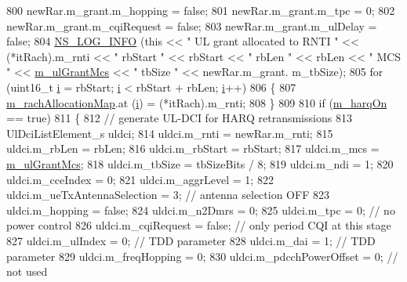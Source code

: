 \begin{DoxyCode}
800       newRar.m\_grant.m\_hopping = \textcolor{keyword}{false};
801       newRar.m\_grant.m\_tpc = 0;
802       newRar.m\_grant.m\_cqiRequest = \textcolor{keyword}{false};
803       newRar.m\_grant.m\_ulDelay = \textcolor{keyword}{false};
804       \hyperlink{group__logging_gafbd73ee2cf9f26b319f49086d8e860fb}{NS\_LOG\_INFO} (\textcolor{keyword}{this} << \textcolor{stringliteral}{" UL grant allocated to RNTI "} << (*itRach).m\_rnti << \textcolor{stringliteral}{" rbStart "} << 
      rbStart << \textcolor{stringliteral}{" rbLen "} << rbLen << \textcolor{stringliteral}{" MCS "} << \hyperlink{classns3_1_1FdTbfqFfMacScheduler_ab528c9593f9398be49667dd8f7864488}{m\_ulGrantMcs} << \textcolor{stringliteral}{" tbSize "} << newRar.m\_grant.
      m\_tbSize);
805       \textcolor{keywordflow}{for} (uint16\_t \hyperlink{bernuolliDistribution_8m_a6f6ccfcf58b31cb6412107d9d5281426}{i} = rbStart; \hyperlink{bernuolliDistribution_8m_a6f6ccfcf58b31cb6412107d9d5281426}{i} < rbStart + rbLen; \hyperlink{bernuolliDistribution_8m_a6f6ccfcf58b31cb6412107d9d5281426}{i}++)
806         \{
807           \hyperlink{classns3_1_1FdTbfqFfMacScheduler_a046aaad84777461862179b30893e38ec}{m\_rachAllocationMap}.at (\hyperlink{bernuolliDistribution_8m_a6f6ccfcf58b31cb6412107d9d5281426}{i}) = (*itRach).m\_rnti;
808         \}
809 
810       \textcolor{keywordflow}{if} (\hyperlink{classns3_1_1FdTbfqFfMacScheduler_afb4bf57d3b17b967f82a5b2134cd70e7}{m\_harqOn} == \textcolor{keyword}{true})
811         \{
812           \textcolor{comment}{// generate UL-DCI for HARQ retransmissions}
813           UlDciListElement\_s uldci;
814           uldci.m\_rnti = newRar.m\_rnti;
815           uldci.m\_rbLen = rbLen;
816           uldci.m\_rbStart = rbStart;
817           uldci.m\_mcs = \hyperlink{classns3_1_1FdTbfqFfMacScheduler_ab528c9593f9398be49667dd8f7864488}{m\_ulGrantMcs};
818           uldci.m\_tbSize = tbSizeBits / 8;
819           uldci.m\_ndi = 1;
820           uldci.m\_cceIndex = 0;
821           uldci.m\_aggrLevel = 1;
822           uldci.m\_ueTxAntennaSelection = 3; \textcolor{comment}{// antenna selection OFF}
823           uldci.m\_hopping = \textcolor{keyword}{false};
824           uldci.m\_n2Dmrs = 0;
825           uldci.m\_tpc = 0; \textcolor{comment}{// no power control}
826           uldci.m\_cqiRequest = \textcolor{keyword}{false}; \textcolor{comment}{// only period CQI at this stage}
827           uldci.m\_ulIndex = 0; \textcolor{comment}{// TDD parameter}
828           uldci.m\_dai = 1; \textcolor{comment}{// TDD parameter}
829           uldci.m\_freqHopping = 0;
830           uldci.m\_pdcchPowerOffset = 0; \textcolor{comment}{// not used}

\end{DoxyCode}
